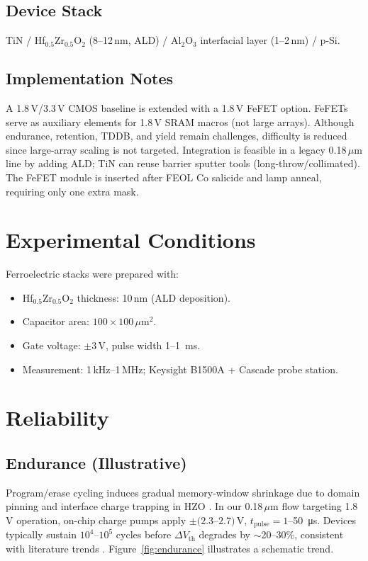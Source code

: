 \documentclass[journal]{IEEEtran}
\begin{document}
\subsection*{Device Stack}
TiN / Hf$_{0.5}$Zr$_{0.5}$O$_2$ (8--12\,nm, ALD) / Al$_2$O$_3$ interfacial layer (1--2\,nm) / p-Si.

\subsection*{Implementation Notes}
A 1.8\,V/3.3\,V CMOS baseline is extended with a 1.8\,V FeFET option. FeFETs serve as auxiliary elements for 1.8\,V SRAM macros (not large arrays). Although endurance, retention, TDDB, and yield remain challenges, difficulty is reduced since large-array scaling is not targeted. Integration is feasible in a legacy 0.18\,$\mu$m line by adding ALD; TiN can reuse barrier sputter tools (long-throw/collimated). The FeFET module is inserted after FEOL Co salicide and lamp anneal, requiring only one extra mask.

\section{Experimental Conditions}
Ferroelectric stacks were prepared with:
\begin{itemize}
  \item Hf$_{0.5}$Zr$_{0.5}$O$_2$ thickness: 10\,nm (ALD deposition).
  \item Capacitor area: $100\times100\,\mu\mathrm{m}^2$.
  \item Gate voltage: $\pm 3$\,V, pulse width 1--\SI{1}{ms}.
  \item Measurement: 1\,kHz--1\,MHz; Keysight B1500A + Cascade probe station.
\end{itemize}

\section{Reliability}
\subsection*{Endurance (Illustrative)}
Program/erase cycling induces gradual memory-window shrinkage due to domain pinning and interface charge trapping in HZO \cite{Muller2015,Park2020}. In our 0.18\,$\mu$m flow targeting 1.8\,V operation, on-chip charge pumps apply $\pm(2.3$--$2.7)$\,V, $t_{\mathrm{pulse}}=1$--\SI{50}{\micro\second}. Devices typically sustain $10^4$--$10^5$ cycles before $\Delta V_\mathrm{th}$ degrades by $\sim$20--30\%, consistent with literature trends \cite{Muller2015,Park2020}. Figure~\ref{fig:endurance} illustrates a schematic trend.
\end{document}
